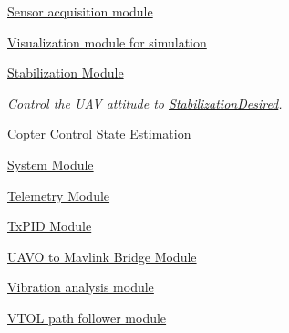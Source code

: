\begin{DoxyCompactItemize}
\hyperlink{group___sensors}{\-Sensor acquisition module}
\item 
\hyperlink{group___visualization_module}{\-Visualization module for simulation}
\item 
\hyperlink{group___stabilization_module}{\-Stabilization Module}
\begin{DoxyCompactList}\small\item\em \-Control the \-U\-A\-V attitude to \hyperlink{group___stabilization_desired}{\-Stabilization\-Desired}. \end{DoxyCompactList}\item 
\hyperlink{group___c_c_state}{\-Copter Control State Estimation}
\item 
\hyperlink{group___system_module}{\-System Module}
\item 
\hyperlink{group___telemetry_module}{\-Telemetry Module}
\item 
\hyperlink{group___tx_p_i_d_module}{\-Tx\-P\-I\-D Module}
\item 
\hyperlink{group___u_a_v_o_mavlink_bridge}{\-U\-A\-V\-O to Mavlink Bridge Module}
\item 
\hyperlink{group___vibration_analysis_module}{\-Vibration analysis module}
\item 
\hyperlink{group___vtol_path_follower}{\-V\-T\-O\-L path follower module}
\end{DoxyCompactItemize}
